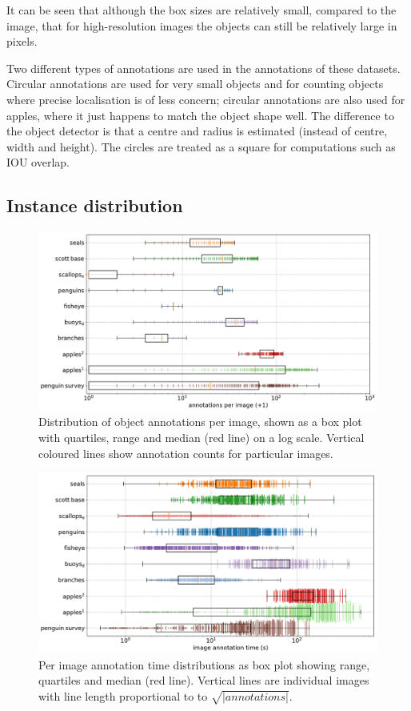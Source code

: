 It can be seen that although the box sizes are relatively small, compared to the image, that for high-resolution images the objects can still be relatively large in pixels.

Two different types of annotations are used in the annotations of these datasets. Circular annotations are used for very small objects and for counting objects where precise localisation is of less concern; circular annotations are also used for apples, where it just happens to match the object shape well. The difference to the object detector is that a centre and radius is estimated (instead of centre, width and height). The circles are treated as a square for computations such as \gls{IOU} overlap.

\subsection {Instance distribution}

\begin{figure}[ht!]
\centering
\includegraphics[width=1.0\linewidth]{charts/summaries/instances_boxplot.pdf}
\caption{ Distribution of object annotations per image, shown as a box plot with quartiles, range and median (red line) on a log scale. Vertical coloured lines show annotation counts for particular images. }
\label{fig:instances_image_plot}
\end{figure}

\begin{figure}[ht]
\centering
\includegraphics[width=1.0\linewidth]{charts/summaries/duration_boxplot.pdf}
\caption{ Per image annotation time distributions as box plot showing range, quartiles and median (red line). Vertical lines are individual images with line length proportional to to $\sqrt{|annotations|}$. }
\label{fig:duration_boxplot}
\end{figure}

